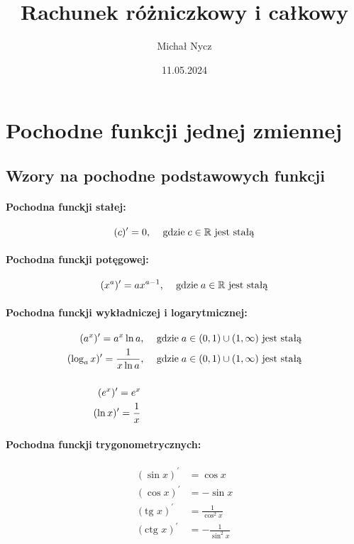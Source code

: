 \documentclass[draft]{article}
\title{Rachunek różniczkowy i całkowy}
\date{11.05.2024}
\author{Michał Nycz}
\begin{document}
    \maketitle
    \tableofcontents
    \newpage

    \section{Pochodne funkcji jednej zmiennej}

    \subsection{Wzory na pochodne podstawowych funkcji}

    \paragraph{Pochodna funckji stałej:}
    \[ (c)^\prime = 0 \text{, \quad gdzie} \; c \in \mathbb{R} \text{ jest stałą} \]
    
    \paragraph{Pochodna funckji potęgowej:}
    \[ (x^a)^\prime = ax^{a-1} \text{, \quad gdzie} \; a \in \mathbb{R} \text{ jest stałą} \]
    
    \paragraph{Pochodna funckji wykładniczej i logarytmicznej:}
    \begin{align*}
        (a^x)^\prime = a^x \ln a &\text{, \quad gdzie} \; a \in (0, 1) \cup (1, \infty) \text{ jest stałą} \\
        (\log_a x)^\prime = \frac{1}{x \ln a} &\text{, \quad gdzie} \; a \in (0, 1) \cup (1, \infty) \text{ jest stałą} \\
        \\
        (e^x)^\prime = e^x \\
        (\ln x)^\prime = \frac{1}{x}
    \end{align*}

    \paragraph{Pochodna funckji trygonometrycznych:}
    \begin{align*}
        (\sin x)^\prime &= \cos x \\
        (\cos x)^\prime &= - \sin x \\
        (\text{tg } x)^\prime &= \frac{1}{\cos^2 x} \\
        (\text{ctg } x)^\prime &= - \frac{1}{\sin^2 x} \\
    \end{align*}
\end{document}
